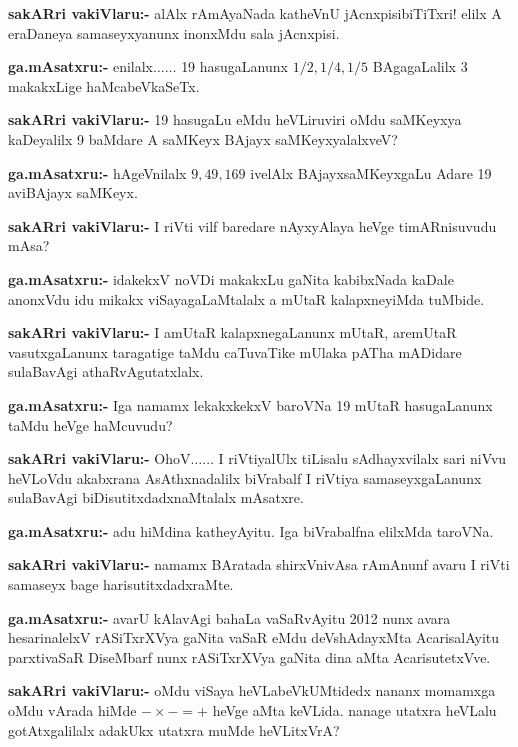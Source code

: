 \smallskip
\noindent
\textbf{sakARri vakiVlaru:-} alAlx rAmAyaNada katheVnU jAcnxpisibiTiTxri! elilx A eraDaneya samaseyxyanunx inonxMdu sala jAcnxpisi.

\smallskip
\noindent
\textbf{ga.mAsatxru:-} enilalx$\ldots\ldots$ {\rm 19} hasugaLanunx $1/2, 1/4, 1/5$ BAgagaLalilx {\rm 3} makakxLige haMcabeVkaSeTx.

\smallskip
\noindent
\textbf{sakARri vakiVlaru:-} {\rm 19} hasugaLu eMdu heVLiruviri oMdu saMKeyxya kaDeyalilx {\rm 9} baMdare A saMKeyx BAjayx saMKeyxyalalxveV?

\smallskip
\noindent
\textbf{ga.mAsatxru:-} hAgeVnilalx $9, 49, 169$ ivelAlx BAjayxsaMKeyxgaLu Adare {\rm 19} aviBAjayx saMKeyx.

\smallskip
\noindent
\textbf{sakARri vakiVlaru:-} I riVti vilf baredare nAyxyAlaya heVge timARnisuvudu mAsa?

\smallskip
\noindent
\textbf{ga.mAsatxru:-} idakekxV noVDi makakxLu gaNita kabibxNada kaDale anonxVdu idu mikakx viSayagaLaMtalalx a mUtaR kalapxneyiMda tuMbide.

\smallskip
\noindent
\textbf{sakARri vakiVlaru:-} I amUtaR kalapxnegaLanunx mUtaR, aremUtaR vasutxgaLanunx taragatige taMdu caTuvaTike mUlaka pATha mADidare sulaBavAgi athaRvAgutatxlalx.

\smallskip
\noindent
\textbf{ga.mAsatxru:-} Iga namamx lekakxkekxV baroVNa {\rm 19} mUtaR hasugaLanunx taMdu heVge haMcuvudu?

\smallskip
\noindent
\textbf{sakARri vakiVlaru:-} OhoV$\ldots\ldots$ I riVtiyalUlx tiLisalu sAdhayxvilalx sari niVvu heVLoVdu akabxrana AsAthxnadalilx biVrabalf I riVtiya samaseyxgaLanunx sulaBavAgi biDisutitxdadxnaMtalalx mAsatxre.

\smallskip
\noindent
\textbf{ga.mAsatxru:-} adu hiMdina katheyAyitu. Iga biVrabalfna elilxMda taroVNa.

\smallskip
\noindent
\textbf{sakARri vakiVlaru:-} namamx BAratada shirxVnivAsa rAmAnunf avaru I riVti samaseyx bage harisutitxdadxraMte.

\smallskip
\noindent
\textbf{ga.mAsatxru:-} avarU kAlavAgi bahaLa vaSaRvAyitu {\rm 2012} nunx avara hesarinalelxV rASiTxrXVya gaNita vaSaR eMdu deVshAdayxMta AcarisalAyitu parxtivaSaR DiseMbarf nunx rASiTxrXVya gaNita dina aMta AcarisutetxVve.

\smallskip
\noindent
\textbf{sakARri vakiVlaru:-} oMdu viSaya heVLabeVkUMtidedx nananx momamxga oMdu vArada hiMde $-\times -=+$ heVge aMta keVLida. nanage utatxra heVLalu gotAtxgalilalx adakUkx utatxra muMde heVLitxVrA?


